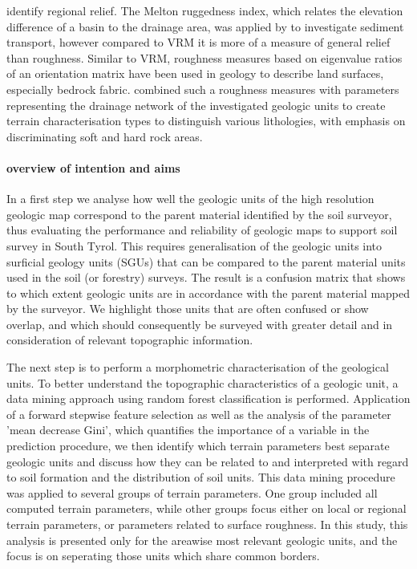 \documentclass[preprint,12pt,authoryear]{elsarticle}
\begin{document}
identify regional relief. The Melton ruggedness index, which relates  the elevation difference of a basin to the drainage area, was applied by \cite{Marchi2005} to investigate sediment transport, however compared to VRM  it is more of a measure of general relief than roughness. Similar to VRM, roughness measures based on eigenvalue ratios of an orientation matrix have been used in geology to describe land surfaces, especially bedrock fabric. \cite{Coblentz2014} combined such a roughness measures with parameters representing the drainage network of the investigated geologic units  to create terrain characterisation types to distinguish various lithologies, with emphasis on discriminating soft and hard rock areas.

\paragraph{overview of intention and aims}
In a first step we analyse how well the geologic units of the high resolution geologic map correspond to the parent material identified by the soil surveyor, thus evaluating the performance and reliability of geologic maps to support soil survey in South Tyrol. This requires generalisation of the geologic units into surficial geology units (SGUs) that can be compared to the parent material units used in the soil (or forestry) surveys.  The result is a confusion matrix that shows to which extent geologic units are in accordance with the parent material mapped by the surveyor. We highlight those units that are often confused or show overlap, and which should consequently be surveyed with greater detail and in consideration of relevant topographic information.

The next step is to perform a morphometric characterisation of the geological units. To better understand the topographic characteristics of a geologic unit, a data mining approach using random forest classification is performed. Application of a forward stepwise feature selection as well as the analysis of the parameter 'mean decrease Gini', which quantifies the importance of a variable in the prediction procedure, we then identify which terrain parameters best separate geologic units and discuss how they can be related to and interpreted with regard to soil formation and the distribution of soil units. This data mining procedure was applied to several groups of terrain parameters. One group included all computed terrain parameters, while other groups focus either on local or regional terrain parameters, or parameters related to surface roughness. In this study, this analysis is presented only for the areawise most relevant geologic units, and the focus is on seperating those units which share common borders.
\end{document}

